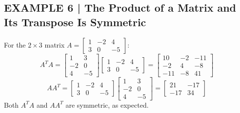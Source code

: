 \documentclass{article}
\theoremstyle{mystyle}
\begin{document}
\subsection*{EXAMPLE 6 | The Product of a Matrix and Its Transpose Is Symmetric}
For the $2\times3$ matrix $A=\begin{bmatrix}1&-2&4\\3&0&-5\end{bmatrix}$:
\[
A^TA=\begin{bmatrix}1&3\\-2&0\\4&-5\end{bmatrix}\begin{bmatrix}1&-2&4\\3&0&-5\end{bmatrix}=\begin{bmatrix}10&-2&-11\\-2&4&-8\\-11&-8&41\end{bmatrix}
\]
\[
AA^T=\begin{bmatrix}1&-2&4\\3&0&-5\end{bmatrix}\begin{bmatrix}1&3\\-2&0\\4&-5\end{bmatrix}=\begin{bmatrix}21&-17\\-17&34\end{bmatrix}
\]
Both $A^TA$ and $AA^T$ are symmetric, as expected.
\end{document}
